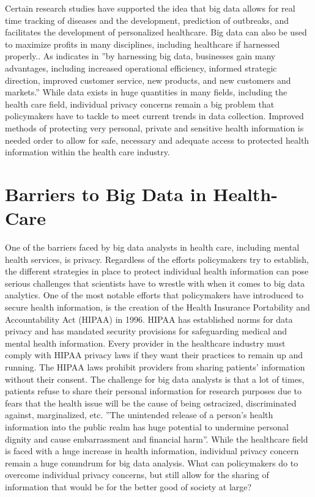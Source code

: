 \documentclass[sigconf]{acmart}
\begin{document}
Certain research studies have supported the idea that big data allows for real time tracking of diseases and the development, prediction of outbreaks, and facilitates the development of personalized healthcare. Big data can also be used to maximize profits in many disciplines, including healthcare if harnessed properly.\cite{van2011health}. As indicates in \cite{khan2014big} ''by harnessing big data, businesses gain many advantages, including increased operational efficiency, informed strategic direction, improved customer service, new products, and new customers and markets.'' While data exists in huge quantities in many fields, including the health care field, individual privacy concerns remain a big problem that policymakers have to tackle to meet current trends in data collection. Improved methods of protecting very personal, private and sensitive health information is needed order to allow for safe, necessary and adequate access to protected health information within the health care industry.

\section{Barriers to Big Data in Health-Care}

One of the barriers faced by big data analysts in health care, including mental health services, is privacy. Regardless of the efforts policymakers try to establish, the different strategies in place to protect individual health information can pose serious challenges that scientists have to wrestle with when it comes to big data analytics. One of the most notable efforts that policymakers have introduced to secure health information, is the creation of the Health Insurance Portability and Accountability Act (HIPAA) in 1996. HIPAA has established norms for data privacy and has mandated security provisions for safeguarding medical and mental health information. Every provider in the healthcare industry must comply with HIPAA privacy laws if they want their practices to remain up and running. The HIPAA laws prohibit providers from sharing patients’ information without their consent. The challenge for big data analysts is that a lot of times, patients refuse to share their personal information for research purposes due to fears that the health issue will be the cause of being ostracized, discriminated against, marginalized, etc. ''The unintended release of a person’s health information into the public realm has huge potential to undermine personal dignity and cause embarrassment and financial harm''\cite{van2011health}. While the healthcare field is faced with a huge increase in health information, individual privacy concern remain a huge conundrum for big data analysis. What can policymakers do to overcome individual privacy concerns, but still allow for the sharing of information that would be for the better good of society at large?
\end{document}
